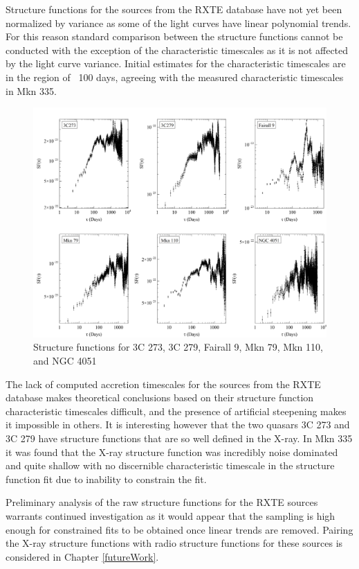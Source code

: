 \documentclass[12pt, oneside]{smuthesis}
\begin{document}
Structure functions for the sources from the RXTE database have not yet been normalized by variance as some of the light curves have linear polynomial trends. For this reason standard comparison between the structure functions cannot be conducted with the exception of the characteristic timescales as it is not affected by the light curve variance. Initial estimates for the characteristic timescales are in the region of ~100 days, agreeing with the measured characteristic timescales in Mkn 335.

\begin{figure}[H]
	\centering
	\includegraphics[width=\linewidth]{combinedstructurefunctions}
	\caption{Structure functions for 3C 273, 3C 279, Fairall 9, Mkn 79, Mkn 110, and NGC 4051}
	\label{fig:combosf}
\end{figure}

The lack of computed accretion timescales for the sources from the RXTE database makes theoretical conclusions based on their structure function characteristic timescales difficult, and the presence of artificial steepening makes it impossible in others. It is interesting however that the two quasars 3C 273 and 3C 279 have structure functions that are so well defined in the X-ray. In Mkn 335 it was found that the X-ray structure function was incredibly noise dominated and quite shallow with no discernible characteristic timescale in the structure function fit due to inability to constrain the fit.

Preliminary analysis of the raw structure functions for the RXTE sources warrants continued investigation as it would appear that the sampling is high enough for constrained fits to be obtained once linear trends are removed. Pairing the X-ray structure functions with radio structure functions for these sources is considered in Chapter \ref{futureWork}.
\end{document}
